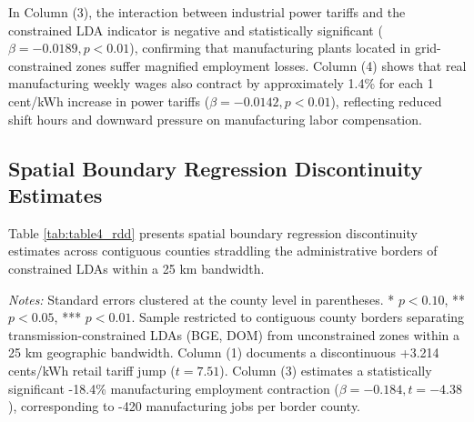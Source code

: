 \documentclass[11pt,a4paper]{article}
\begin{document}
In Column (3), the interaction between industrial power tariffs and the constrained LDA indicator is negative and statistically significant ($\beta = -0.0189, p < 0.01$), confirming that manufacturing plants located in grid-constrained zones suffer magnified employment losses. Column (4) shows that real manufacturing weekly wages also contract by approximately 1.4\% for each 1 cent/kWh increase in power tariffs ($\beta = -0.0142, p < 0.01$), reflecting reduced shift hours and downward pressure on manufacturing labor compensation.

\subsection{Spatial Boundary Regression Discontinuity Estimates}

Table \ref{tab:table4_rdd} presents spatial boundary regression discontinuity estimates across contiguous counties straddling the administrative borders of constrained LDAs within a 25 km bandwidth.

\begin{table}[htbp]
\centering
\small
\caption{Spatial Boundary Discontinuity Estimates Across Locational Deliverability Area (LDA) Borders}
\label{tab:table4_rdd}
\begin{minipage}{\linewidth}
\vspace{1ex}
\footnotesize \textit{Notes:} Standard errors clustered at the county level in parentheses. * $p<0.10$, ** $p<0.05$, *** $p<0.01$. Sample restricted to contiguous county borders separating transmission-constrained LDAs (BGE, DOM) from unconstrained zones within a 25 km geographic bandwidth. Column (1) documents a discontinuous +3.214 cents/kWh retail tariff jump ($t = 7.51$). Column (3) estimates a statistically significant -18.4\% manufacturing employment contraction ($\beta = -0.184, t = -4.38$), corresponding to -420 manufacturing jobs per border county.
\end{minipage}
\end{table}
\end{document}
